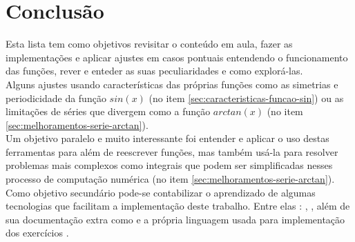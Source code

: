 \section{Conclusão}
Esta lista tem como objetivos revisitar o conteúdo em aula, fazer as implementações e aplicar ajustes em casos pontuais entendendo o funcionamento das funções, rever e enteder as suas peculiaridades e como explorá-las. \\
Alguns ajustes usando características das próprias funções como as simetrias e periodicidade da função $sin(x)$ (no item \ref{sec:caracteristicas-funcao-sin}) ou as limitações de séries que divergem como a função $arctan(x)$ (no item \ref{sec:melhoramentos-serie-arctan}).\\
Um objetivo paralelo e muito interessante foi entender e aplicar o uso destas ferramentas para além de reescrever funções, mas também usá-la para resolver problemas mais complexos como integrais que podem ser simplificadas nesses processo de computação numérica (no item \ref{sec:melhoramentos-serie-arctan}).\\
Como objetivo secundário pode-se contabilizar o aprendizado de algumas tecnologias que facilitam a implementação deste trabalho.
Entre elas : \cite{site-latex}, \cite{site-gradle}, \cite{site-gnuplot-oficial} além de sua documentação extra como \cite{site-gnuplot-documentacao} e a própria linguagem usada para implementação dos exercícios \cite{site-python-org}.